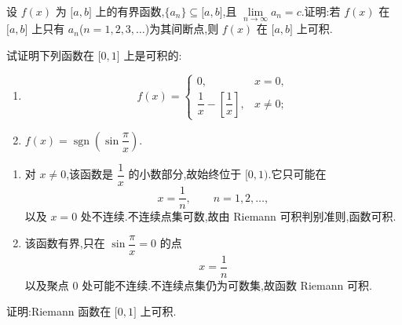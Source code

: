 \begin{proposition}[\markstar]
    设 $f(x)$ 为 $\lbrack a,b\rbrack$ 上的有界函数,$\{a_n\}\subseteq\lbrack a,b\rbrack$,且 $\displaystyle\lim\limits_{n\to\infty}a_n=c$.证明:若 $f(x)$ 在 $\lbrack a,b\rbrack$ 上只有 $a_n$($n=1,2,3,\ldots$)为其间断点,则 $f(x)$ 在 $\lbrack a,b\rbrack$ 上可积.
\end{proposition}

\begin{example}
    试证明下列函数在 $\lbrack 0,1\rbrack$ 上是可积的:
    \begin{enumerate}
        \item
              \[
                  f(x)=\begin{cases}
                      0,                                      & x=0,    \\
                      \dfrac{1}{x}-\left[\dfrac{1}{x}\right], & x\neq0;
                  \end{cases}
              \]
        \item $f(x)=\operatorname{sgn}\left(\sin\dfrac{\pi}{x}\right)$.
    \end{enumerate}
\end{example}
\exampleblank

\begin{solution}
    \leavevmode
    \begin{enumerate}
        \item 对 $x\neq0$,该函数是 $\dfrac{1}{x}$ 的小数部分,故始终位于 $\lbrack0,1)$.它只可能在
              \[
                  x=\dfrac{1}{n},
                  \qquad n=1,2,\ldots,
              \]
              以及 $x=0$ 处不连续.不连续点集可数,故由 Riemann 可积判别准则,函数可积.

        \item 该函数有界,只在 $\sin\dfrac{\pi}{x}=0$ 的点
              \[
                  x=\dfrac{1}{n}
              \]
              以及聚点 $0$ 处可能不连续.不连续点集仍为可数集,故函数 Riemann 可积.
    \end{enumerate}
\end{solution}

\begin{example}[\markstar]
    证明:Riemann 函数在 $\lbrack 0,1\rbrack$ 上可积.
\end{example}
\exampleblank

